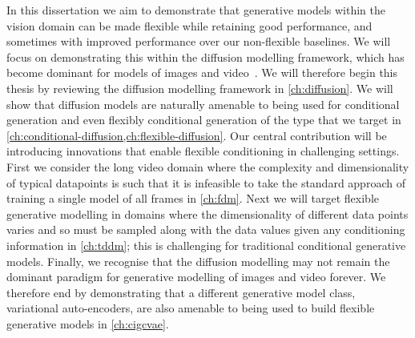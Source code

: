 
In this dissertation we aim to demonstrate that generative models within the vision domain can be made flexible while retaining good performance, and sometimes with improved performance over our non-flexible baselines. We will focus on demonstrating this within the diffusion modelling framework, which has become dominant for models of images and video~\citep{sohl2015deep,ho2020denoising,dhariwal2021diffusion,rombach2022high,ho2022imagen,peebles2022scalable,brooks2024video}. We will therefore begin this thesis by reviewing the diffusion modelling framework in \cref{ch:diffusion}. We will show that diffusion models are naturally amenable to being used for conditional generation and even flexibly conditional generation of the type that we target in \cref{ch:conditional-diffusion,ch:flexible-diffusion}. Our central contribution will be introducing innovations that enable flexible conditioning in challenging settings. First we consider the long video domain where the complexity and dimensionality of typical datapoints is such that it is infeasible to take the standard approach of training a single model of all frames in \cref{ch:fdm}. Next we will target flexible generative modelling in domains where the dimensionality of different data points varies and so must be sampled along with the data values given any conditioning information in \cref{ch:tddm}; this is challenging for traditional conditional generative models. Finally, we recognise that the diffusion modelling may not remain the dominant paradigm for generative modelling of images and video forever. We therefore end by demonstrating that a different generative model class, variational auto-encoders, are also amenable to being used to build flexible generative models in \cref{ch:cigcvae}.

